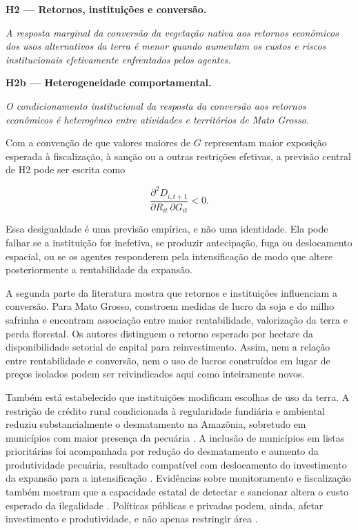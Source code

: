\medskip

\noindent\textbf{H2 --- Retornos, instituições e conversão.}

\emph{A resposta marginal da conversão da vegetação nativa aos retornos econômicos dos usos alternativos da terra é menor quando aumentam os custos e riscos institucionais efetivamente enfrentados pelos agentes.}

\medskip

\noindent\textbf{H2b --- Heterogeneidade comportamental.}

\emph{O condicionamento institucional da resposta da conversão aos retornos econômicos é heterogêneo entre atividades e territórios de Mato Grosso.}

Com a convenção de que valores maiores de $G$ representam maior exposição esperada à fiscalização, à sanção ou a outras restrições efetivas, a previsão central de H2 pode ser escrita como

\begin{equation}
    \frac{\partial^2 D_{i,t+1}}
    {\partial R_{it}\,\partial G_{it}} < 0.
    \label{eq:cross_partial_h2}
\end{equation}

Essa desigualdade é uma previsão empírica, e não uma identidade. Ela pode falhar se a instituição for inefetiva, se produzir antecipação, fuga ou deslocamento espacial, ou se os agentes responderem pela intensificação de modo que altere posteriormente a rentabilidade da expansão.

A segunda parte da literatura mostra que retornos e instituições influenciam a conversão. Para Mato Grosso, \cite{richards2026profits} constroem medidas de lucro da soja e do milho safrinha e encontram associação entre maior rentabilidade, valorização da terra e perda florestal. Os autores distinguem o retorno esperado por hectare da disponibilidade setorial de capital para reinvestimento. Assim, nem a relação entre rentabilidade e conversão, nem o uso de lucros construídos em lugar de preços isolados podem ser reivindicados aqui como inteiramente novos.

Também está estabelecido que instituições modificam escolhas de uso da terra. A restrição de crédito rural condicionada à regularidade fundiária e ambiental reduziu substancialmente o desmatamento na Amazônia, sobretudo em municípios com maior presença da pecuária \cite{assuncao2020credit}. A inclusão de municípios em listas prioritárias foi acompanhada por redução do desmatamento e aumento da produtividade pecuária, resultado compatível com deslocamento do investimento da expansão para a intensificação \cite{koch2019productivity}. Evidências sobre monitoramento e fiscalização também mostram que a capacidade estatal de detectar e sancionar altera o custo esperado da ilegalidade \cite{assuncao2023deter}. Políticas públicas e privadas podem, ainda, afetar investimento e produtividade, e não apenas restringir área \cite{moffette2021policies}.


